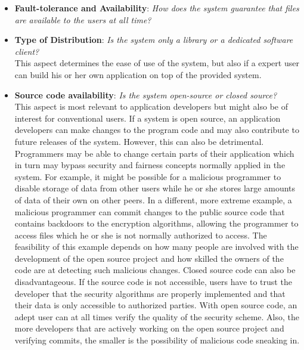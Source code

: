 \begin{itemize}
\item \textbf{Fault-tolerance and Availability}: \textit{How does the system guarantee that files are available to the users at all time?}\\

\item \textbf{Type of Distribution}: \textit{Is the system only a library or a dedicated software client?}\\
This aspect determines the ease of use of the system, but also if a expert user can build his or her own application on top of the provided system.

\item \textbf{Source code availability}: \textit{Is the system open-source or closed source?}\\
This aspect is most relevant to application developers but might also be of interest for conventional users. If a system is open source, an application developers can make changes to the program code and may also contribute to future releases of the system. However, this can also be detrimental. Programmers may be able to change certain parts of their application which in turn may bypass security and fairness concepts normally applied in the system. For example, it might be possible for a malicious programmer to disable storage of data from other users while he or she stores large amounts of data of their own on other peers. In a different, more extreme example, a malicious programmer can commit changes to the public source code that contains backdoors to the encryption algorithms, allowing the programmer to access files which he or she is not normally authorized to access. The feasibility of this example depends on how many people are involved with the development of the open source project and how skilled the owners of the code are at detecting such malicious changes.
Closed source code can also be disadvantageous. If the source code is not accessible, users have to trust the developer that the security algorithms are properly implemented and that their data is only accessible to authorized parties. With open source code, an adept user can at all times verify the quality of the security scheme. Also, the more developers that are actively working on the open source project and verifying commits, the smaller is the possibility of malicious code sneaking in.


\end{itemize}
